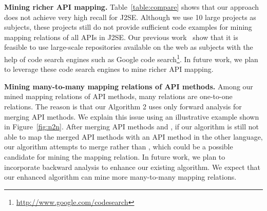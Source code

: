 \textbf{Mining richer API mapping.} Table~\ref{table:compare} shows
that our approach does not achieve very high recall for J2SE. Although we
use 10 large projects as subjects, these projects still do not
provide sufficient code examples for mining mapping relations of all
APIs in J2SE. Our previous
work~\cite{thummalapenta07parseweb,thummalapentaase08spotweb} show
that it is feasible to use large-scale repositories available on the
web as subjects with the help of code search engines such as Google
code search\footnote{\url{http://www.google.com/codesearch}}. In
future work, we plan to leverage these code search engines to mine
richer API mapping.


\textbf{Mining many-to-many mapping relations of API methods.} Among
our mined mapping relations of API methods, many relations are
one-to-one relations. The reason is that our Algorithm 2 uses only
forward analysis for merging API methods. We explain this issue
using an illustrative example shown in Figure~\ref{fig:n2n}. After
merging API methods  and , if our
algorithm is still not able to map the merged API methods with an API
method in the other language, our algorithm attempts to merge
 rather than , which could be a
possible candidate for mining the mapping relation. In future work,
we plan to incorporate backward analysis to enhance our existing
algorithm. We expect that our enhanced algorithm can mine more
many-to-many mapping relations.


